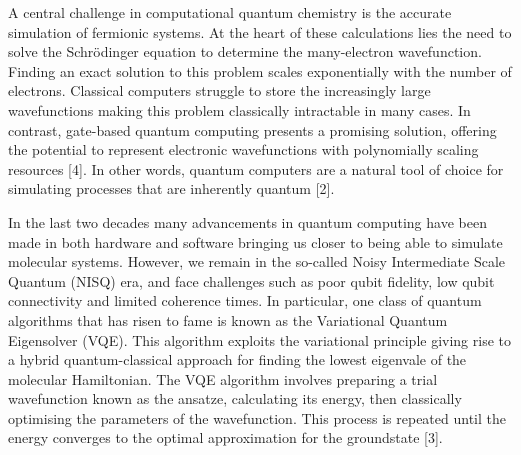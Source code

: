 A central challenge in computational quantum chemistry is the accurate simulation of fermionic systems. At the heart of these calculations lies the need to solve the Schrödinger equation to determine the many-electron wavefunction. Finding an exact solution to this problem scales exponentially with the number of electrons. Classical computers struggle to store the increasingly large wavefunctions making this problem classically intractable in many cases. In contrast, gate-based quantum computing presents a promising solution, offering the potential to represent electronic wavefunctions with polynomially scaling resources [4]. In other words, quantum computers are a natural tool of choice for simulating processes that are inherently quantum [2].

In the last two decades many advancements in quantum computing have been made in both hardware and software bringing us closer to being able to simulate molecular systems. However, we remain in the so-called Noisy Intermediate Scale Quantum (NISQ) era, and face challenges such as poor qubit fidelity, low qubit connectivity and limited coherence times. In particular, one class of quantum algorithms that has risen to fame is known as the Variational Quantum Eigensolver (VQE). This algorithm exploits the variational principle giving rise to a hybrid quantum-classical approach for finding the lowest eigenvale of the molecular Hamiltonian. The VQE algorithm involves preparing a trial wavefunction known as the ansatze, calculating its energy, then classically optimising the parameters of the wavefunction. This process is repeated until the energy converges to the optimal approximation for the groundstate [3].
